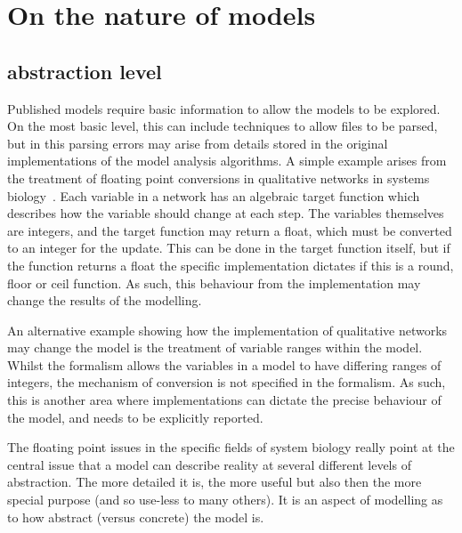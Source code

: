 \documentclass[conference]{IEEEtran}
\begin{document}

\section{On the nature of models}


\subsection{abstraction level} 

Published models require basic information to allow the models to be
explored. On the most basic level, this can include techniques to allow
files to be parsed, but in this parsing errors may arise from details 
stored in the original implementations of the model analysis algorithms.
A simple example arises from the treatment of floating point conversions
in qualitative networks in systems biology~\cite{Schaub2007}. Each
variable in a network has an algebraic target function which describes
how the variable should change at each step. The variables themselves are
integers, and the target function may return a float, which must be converted
to an integer for the update. This can be done in the target function 
itself, but if the function returns a float the specific implementation
dictates if this is a round, floor or ceil function. As such, this behaviour
from the implementation may change the results of the modelling.

An alternative example showing how the implementation of qualitative networks
may change the model is the treatment of variable ranges within the model.
Whilst the formalism allows the variables in a model to have differing 
ranges of integers, the mechanism of conversion is not specified in the 
formalism. As such, this is another area where implementations can dictate
the precise behaviour of the model, and needs to be explicitly reported.

The floating point issues in the specific fields of system biology
really point at the central issue that a model can describe reality at
several different levels of abstraction. The more detailed it is, the
more useful but also then the more special purpose (and so use-less to
many others). It is an aspect of modelling as to how abstract (versus
concrete) the model is.


\end{document}
